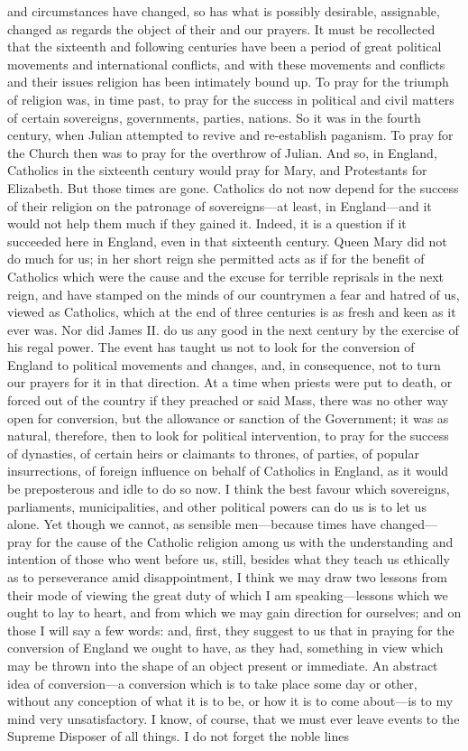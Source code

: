 and circumstances have changed, so has what is possibly desirable,
assignable, changed as regards the object of their and our prayers. It
must be recollected that the sixteenth and following centuries have
been a period of great political movements and international
conflicts, and with these movements and conflicts and their issues
religion has been intimately bound up. To pray for the triumph of
religion was, in time past, to pray for the success in political and
civil matters of certain sovereigns, governments, parties, nations. So
it was in the fourth century, when Julian attempted to revive and
re-establish paganism. To pray for the Church then was to pray for the
overthrow of Julian. And so, in England, Catholics in the sixteenth
century would pray for Mary, and Protestants for Elizabeth. But those
times are gone. Catholics do not now depend for the success of their
religion on the patronage of sovereigns—at least, in England—and
it would not help them much if they gained it. Indeed, it is a
question if it succeeded here in England, even in that sixteenth
century. Queen Mary did not do much for us; in her short reign she
permitted acts as if for the benefit of Catholics which were the cause
and the excuse for terrible reprisals in the next reign, and have
stamped on the minds of our countrymen a fear and hatred of us, viewed
as Catholics, which at the end of three centuries is as fresh and keen
as it ever was. Nor did James II. do us any good in the next century
by the exercise of his regal power. The event has taught us not to
look for the conversion of England to political movements and changes,
and, in consequence, not to turn our prayers for it in that direction.
At a time when priests were put to death, or forced out of the country
if they preached or said Mass, there was no other way open for
conversion, but the allowance or sanction of the Government; it was as
natural, therefore, then to look for political intervention, to pray
for the success of dynasties, of certain heirs or claimants to
thrones, of parties, of popular insurrections, of foreign influence on
behalf of Catholics in England, as it would be preposterous and idle
to do so now. I think the best favour which sovereigns, parliaments,
municipalities, and other political powers can do us is to let us
alone. Yet though we cannot, as sensible men—because times have
changed—pray for the cause of the Catholic religion among us with
the understanding and intention of those who went before us, still,
besides what they teach us ethically as to perseverance amid
disappointment, I think we may draw two lessons from their mode of
viewing the great duty of which I am speaking—lessons which we ought
to lay to heart, and from which we may gain direction for ourselves;
and on those I will say a few words: and, first, they suggest to us
that in praying for the conversion of England we ought to have, as
they had, something in view which may be thrown into the shape of an
object present or immediate. An abstract idea of conversion—a
conversion which is to take place some day or other, without any
conception of what it is to be, or how it is to come about—is to my
mind very unsatisfactory. I know, of course, that we must ever leave
events to the Supreme Disposer of all things. I do not forget the
noble lines

